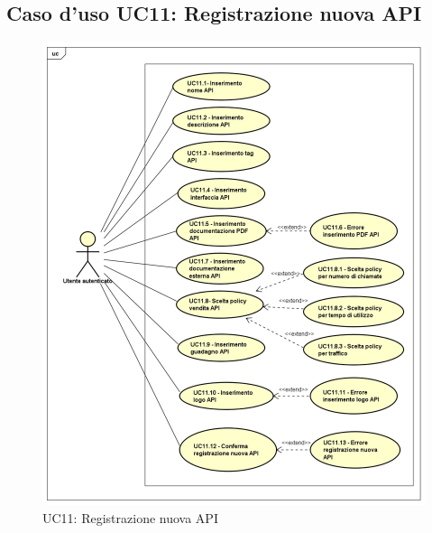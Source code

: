 \newpage
\subsection{Caso d'uso UC11: Registrazione nuova API}
\label{UC11}
\begin{figure}[ht]
	\centering
	\includegraphics[scale=0.45]{UML/UC11.png}
	\caption{UC11: Registrazione nuova API}
\end{figure}

